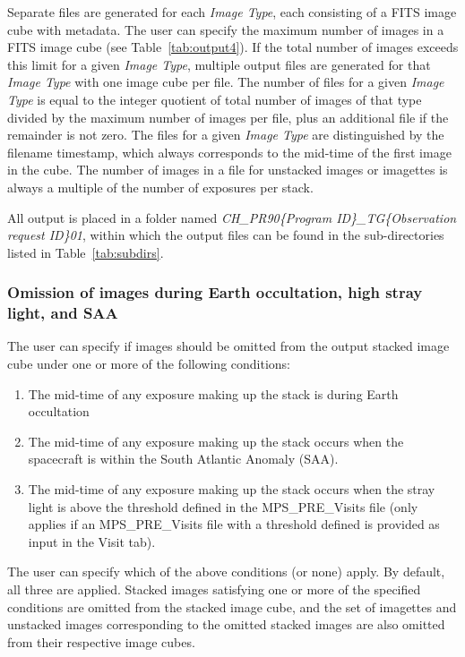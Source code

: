 \documentclass[11pt]{article}      %
\begin{document}
Separate files are generated for each  {\it Image Type}, each consisting of a FITS image cube with metadata. The user can specify the maximum number of images in a FITS image cube (see Table~\ref{tab:output4}). If the total number of images exceeds this limit for a given  {\it Image Type}, multiple output files are generated for that  {\it Image Type} with one image cube per file. The number of files for a given {\it Image Type} is equal to the integer quotient of total number of images of that type divided by the maximum number of images per file, plus an additional file if the remainder is not zero. The files for a given {\it Image Type} are distinguished by the filename timestamp, which always corresponds to the mid-time of the first image in the cube. The number of images in a file for unstacked images or imagettes is always a multiple of the number of exposures per stack.

All output is placed in a folder named {\it CH\_PR90\{Program ID\}\_TG\{Observation request ID\}01}, within which the output files can be found in the sub-directories listed in Table~\ref{tab:subdirs}.

\subsubsection{Omission of images during Earth occultation, high stray light, and SAA}
\label{sec:omitImages}

The user can specify if images should be omitted from the output stacked image cube under one or more of the following conditions:
\begin{enumerate}
\item The mid-time of any exposure making up the stack is during Earth occultation 
\item The mid-time of any exposure making up the stack occurs when the spacecraft is within the South Atlantic Anomaly (SAA). 
\item The mid-time of any exposure making up the stack occurs when the stray light is above the threshold defined in the MPS\_PRE\_Visits file (only applies if an MPS\_PRE\_Visits file with a threshold defined is provided as input in the Visit tab).
\end{enumerate}
The user can specify which of the above conditions (or none) apply. By default, all three are applied. Stacked images satisfying one or more of the specified conditions are omitted from the stacked image cube, and the set of imagettes and unstacked images corresponding to the omitted stacked images are also omitted from their respective image cubes.
\end{document}
